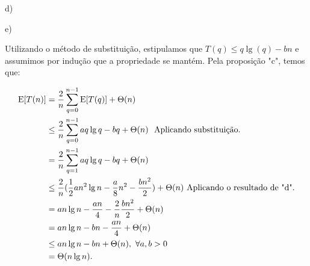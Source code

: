 \documentclass{article}
\begin{document}
d)

e)

Utilizando o método de substituição, estipulamos que $T(q) \le q \lg(q)-bn$ e assumimos por indução que a propriedade se mantém. Pela proposição "c", temos que:

\begin{align*}
\text E[T(n)]
& = \frac{2}{n} \sum_{q=0}^{n-1} \text E[T(q)] + \Theta(n) \\
& \le \frac{2}{n} \sum_{q=0}^{n-1}aq\lg q-bq + \Theta(n)\ \  \text{Aplicando substituição.}\\
& = \frac{2}{n} \sum_{q=1}^{n-1}aq\lg q -bq + \Theta(n) \\
& \le \frac{2}{n}(\frac{1}{2}an^2\lg n - \frac{a}{8}n^2 -\frac{bn^2}{2}) + \Theta(n)\  \text{Aplicando o resultado de "d".}\\
& = an\lg n -\frac{an}{4} - \frac{2}{n}\frac{bn^2}{2} + \Theta(n) \\
& = an\lg n - bn -\frac{an}{4} + \Theta(n) \\ 
& \le an\lg n - bn + \Theta(n),\ \forall a,b > 0\\
& = \Theta(n\lg n).
\end{align*}

\end{document}
